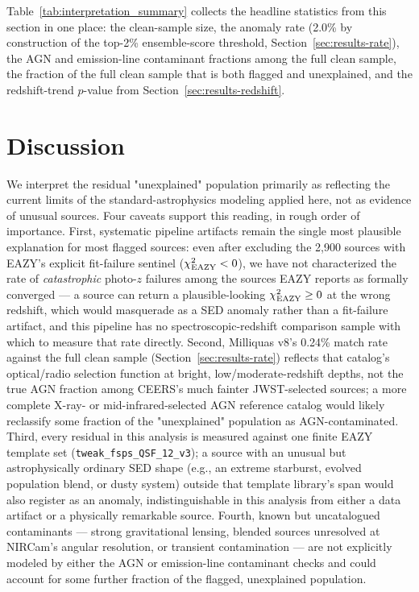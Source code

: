 \documentclass[twocolumn]{aastex631}
\begin{document}
Table~\ref{tab:interpretation_summary} collects the headline statistics
from this section in one place: the clean-sample size, the anomaly rate
(2.0\% by construction of the top-2\% ensemble-score threshold,
Section~\ref{sec:results-rate}), the AGN and emission-line contaminant
fractions among the full clean sample, the fraction of the full clean
sample that is both flagged and unexplained, and the redshift-trend
$p$-value from Section~\ref{sec:results-redshift}.



\section{Discussion}
\label{sec:discussion}

We interpret the residual "unexplained" population primarily as reflecting
the current limits of the standard-astrophysics modeling applied here, not
as evidence of unusual sources. Four caveats support this reading, in
rough order of importance. First, systematic pipeline artifacts remain the
single most plausible explanation for most flagged sources: even after
excluding the 2,900 sources with EAZY's explicit fit-failure sentinel
($\chi^2_{\rm EAZY}<0$), we have not characterized the rate of
\emph{catastrophic} photo-$z$ failures among the sources EAZY reports as
formally converged --- a source can return a plausible-looking
$\chi^2_{\rm EAZY} \ge 0$ at the wrong redshift, which would masquerade as
a SED anomaly rather than a fit-failure artifact, and this pipeline
has no spectroscopic-redshift comparison sample with which to measure that
rate directly. Second, Milliquas v8's 0.24\% match rate against the full
clean sample (Section~\ref{sec:results-rate}) reflects that catalog's
optical/radio selection function at bright, low/moderate-redshift depths,
not the true AGN fraction among CEERS's much fainter JWST-selected
sources; a more complete X-ray- or mid-infrared-selected AGN reference
catalog would likely reclassify some fraction of the "unexplained"
population as AGN-contaminated. Third, every residual in this analysis is
measured against one finite EAZY template set
(\texttt{tweak\_fsps\_QSF\_12\_v3}); a source with an unusual but
astrophysically ordinary SED shape (e.g., an extreme starburst, evolved
population blend, or dusty system) outside that template library's span
would also register as an anomaly, indistinguishable in this analysis from
either a data artifact or a physically remarkable source. Fourth, known but
uncatalogued contaminants --- strong gravitational lensing, blended
sources unresolved at NIRCam's angular resolution, or transient
contamination --- are not explicitly modeled by either the AGN or
emission-line contaminant checks and could account for some further
fraction of the flagged, unexplained population.
\end{document}
